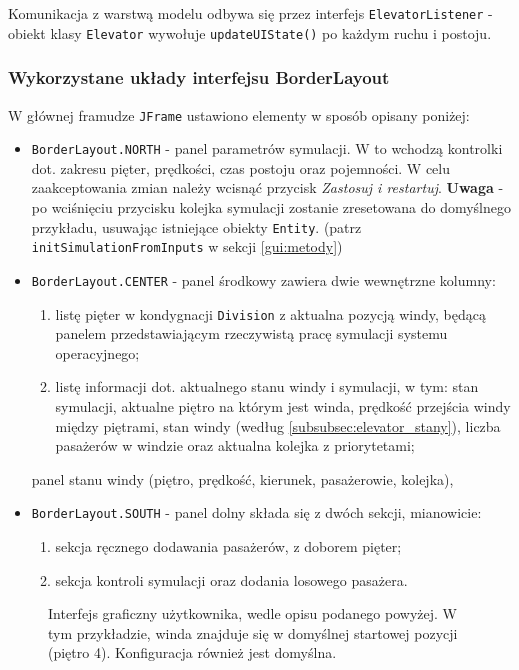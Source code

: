 \documentclass[12pt, a4paper]{article}
\begin{document}
Komunikacja z warstwą modelu odbywa się przez interfejs \texttt{ElevatorListener} - obiekt klasy \texttt{Elevator} wywołuje 
\texttt{updateUIState()} po każdym ruchu i postoju.

\subsubsection{Wykorzystane układy interfejsu BorderLayout}
W głównej framudze \texttt{JFrame} ustawiono elementy w sposób opisany poniżej: 
\begin{itemize}
  \item \texttt{BorderLayout.NORTH} - panel parametrów symulacji. W to wchodzą kontrolki dot. zakresu pięter, prędkości, czas postoju oraz pojemności.
  W celu zaakceptowania zmian należy wcisnąć przycisk \emph{Zastosuj i restartuj}. \textbf{Uwaga} - po wciśnięciu przycisku kolejka symulacji zostanie zresetowana 
  do domyślnego przykładu, usuwając istniejące obiekty \texttt{Entity}. (patrz \texttt{initSimulationFromInputs} w sekcji \ref{gui:metody})
  \item \texttt{BorderLayout.CENTER} - panel środkowy zawiera dwie wewnętrzne kolumny:
  \begin{enumerate}
    \item listę pięter w kondygnacji \texttt{Division} z aktualna pozycją windy, będącą panelem przedstawiającym rzeczywistą pracę symulacji systemu operacyjnego;
    \item listę informacji dot. aktualnego stanu windy i symulacji, w tym: stan symulacji, aktualne piętro na którym jest winda, prędkość przejścia windy między piętrami, 
          stan windy (według \ref{subsubsec:elevator_stany}), liczba pasażerów w windzie oraz aktualna kolejka z priorytetami;
  \end{enumerate} panel stanu windy (piętro, prędkość, kierunek, pasażerowie, kolejka),
  \item \texttt{BorderLayout.SOUTH} - panel dolny składa się z dwóch sekcji, mianowicie:
  \begin{enumerate}
    \item sekcja ręcznego dodawania pasażerów, z doborem pięter;
    \item sekcja kontroli symulacji oraz dodania losowego pasażera.
  \end{enumerate} 
\end{itemize}

\begin{figure}[H]
  
  \caption{Interfejs graficzny użytkownika, wedle opisu podanego powyżej. W tym przykładzie, winda znajduje się w domyślnej startowej pozycji (piętro 4). Konfiguracja 
  również jest domyślna.}
\end{figure}
\end{document}
